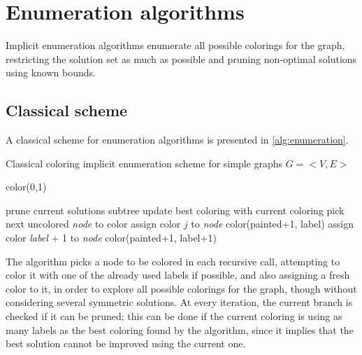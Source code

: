 
\section{Enumeration algorithms}
\label{sec:heur}

Implicit enumeration algorithms enumerate all possible colorings for the graph, restricting the solution set as much as possible and pruning non-optimal solutions using known bounds. 

\subsection{Classical scheme}

A classical scheme for enumeration algorithms is presented in \ref{alg:enumeration}.

\begin{algorithm}
\caption{Classical coloring implicit enumeration scheme for simple graphs $G = <V,E>$}
\label{alg:enumeration}

\begin{algorithmic}
\CALL color(0,1)

		\STATE prune current solutions subtree
		\STATE update best coloring with current coloring
	\ELSE
		\STATE pick next uncolored \textit{node} to color		
				\STATE assign color $j$ to \textit{node}
				\CALL color(painted+1, label)
			\ENDIF
		\ENDFOR
		\STATE assign color \textit{label} + 1 to \textit{node}
		\CALL color(painted+1, label+1)
	\ENDIF
\ENDPROC

\end{algorithmic}
\end{algorithm}

The algorithm picks a node to be colored in each recursive call, attempting to color it with one of the already used labels if possible, and also  assigning a fresh color to it, in order to explore all possible colorings for the graph, though without considering several symmetric solutions. At every iteration, the current branch is checked if it can be pruned; this can be done if the current coloring is using as many labels as the best coloring found by the algorithm, since it implies that the best solution cannot be improved using the current one.

